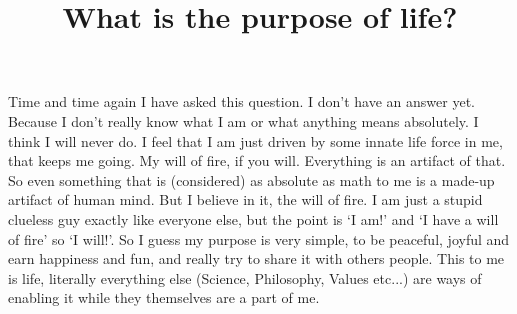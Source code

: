 \documentclass[12pt]{article}
\title{What is the purpose of life?}
\author{}
\begin{document}
\maketitle

Time and time again I have asked this question.
I don't have an answer yet.
Because I don't really know what I am or what anything means absolutely.
I think I will never do.
I feel that I am just driven by some innate life force in me, that keeps me going.
My will of fire, if you will.
Everything is an artifact of that.
So even something that is (considered) as absolute as math to me is a made-up artifact of human mind.
But I believe in it, the will of fire.
I am just a stupid clueless guy exactly like everyone else, but the point is `I am!' and `I have a will of fire' so `I will!'.
So I guess my purpose is very simple, to be peaceful, joyful and earn happiness and fun, and really try to share it with others people.
This to me is life, literally everything else (Science, Philosophy, Values etc...) are ways of enabling it while they themselves are a part of me.
\end{document}
